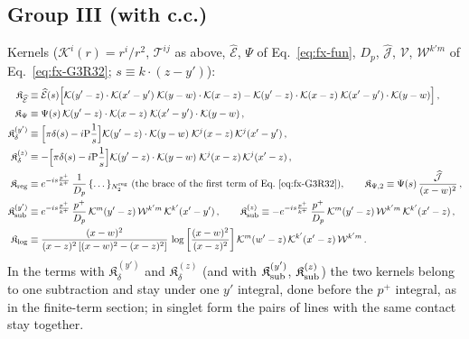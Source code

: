 {\subsection{Group III (with c.c.)}
\noindent Kernels ($\mathcal{K}^{i}(r)=r^{i}/r^{2}$, $\mathcal{T}^{ij}$ as above, $\widehat{\mathcal{E}}$, $\Psi$ of Eq.~\eqref{eq:fx-fun}, $D_{p}$, $\widehat{\mathcal{J}}$, $\mathcal{V}$, $\mathcal{W}^{k'm}$ of Eq.~\eqref{eq:fx-G3R32}; $s\equiv k\cdot(z-y')$):
\begin{align}
\mathfrak{K}_{\widehat{\mathcal{E}}}&\equiv\widehat{\mathcal{E}}(s)\Big[\mathcal{K}(y'-z)\cdot\mathcal{K}(x'-y')\;\mathcal{K}(y-w)\cdot\mathcal{K}(x-z)-\mathcal{K}(y'-z)\cdot\mathcal{K}(x-z)\;\mathcal{K}(x'-y')\cdot\mathcal{K}(y-w)\Big]\,,\notag\\
\mathfrak{K}_{\Psi}&\equiv\Psi(s)\,\mathcal{K}(y'-z)\cdot\mathcal{K}(x-z)\;\mathcal{K}(x'-y')\cdot\mathcal{K}(y-w)\,,\notag\\
\mathfrak{K}_{\delta}^{(y')}&\equiv\Big[\pi\delta(s)-i{\rm P}\frac{1}{s}\Big]\mathcal{K}(y'-z)\cdot\mathcal{K}(y-w)\;\mathcal{K}^{j}(x-z)\,\mathcal{K}^{j}(x'-y')\,,\notag\\
\mathfrak{K}_{\delta}^{(z)}&\equiv-\Big[\pi\delta(s)-i{\rm P}\frac{1}{s}\Big]\mathcal{K}(y'-z)\cdot\mathcal{K}(y-w)\;\mathcal{K}^{j}(x-z)\,\mathcal{K}^{j}(x'-z)\,,\notag\\
\mathfrak{K}_{\rm reg}&\equiv e^{-is\frac{p^{+}}{k^{+}}}\,\frac{1}{D_{p}}\,\{\dots\}_{N_{2}^{\rm reg}}\ \text{(the brace of the first term of Eq.~\eqref{eq:fx-G3R32})},\qquad
\mathfrak{K}_{\Psi,2}\equiv\Psi(s)\,\frac{\widehat{\mathcal{J}}}{(x-w)^{2}}\,,\notag\\
\mathfrak{K}_{\rm sub}^{(y')}&\equiv e^{-is\frac{p^{+}}{k^{+}}}\,\frac{p^{+}}{D_{p}}\,\mathcal{K}^{m}(y'-z)\,\mathcal{W}^{k'm}\,\mathcal{K}^{k'}(x'-y')\,,\qquad
\mathfrak{K}_{\rm sub}^{(z)}\equiv-e^{-is\frac{p^{+}}{k^{+}}}\,\frac{p^{+}}{D_{p}}\,\mathcal{K}^{m}(y'-z)\,\mathcal{W}^{k'm}\,\mathcal{K}^{k'}(x'-z)\,,\notag\\
\mathfrak{K}_{\log}&\equiv\frac{(x-w)^{2}}{(x-z)^{2}\left[(x-w)^{2}-(x-z)^{2}\right]}\,\log\left[\frac{(x-w)^{2}}{(x-z)^{2}}\right]\mathcal{K}^{m}(w'-z)\,\mathcal{K}^{k'}(x'-z)\,\mathcal{W}^{k'm}\,.\notag
\end{align}
In the terms with $\mathfrak{K}_{\delta}^{(y')}$ and $\mathfrak{K}_{\delta}^{(z)}$ (and with $\mathfrak{K}_{\rm sub}^{(y')}$, $\mathfrak{K}_{\rm sub}^{(z)}$) the two kernels belong to one subtraction and stay under one $y'$ integral, done before the $p^{+}$ integral, as in the finite-term section; in singlet form the pairs of lines with the same contact stay together.
}
